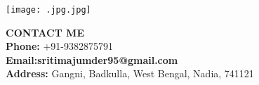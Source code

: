 \documentclass[12pt]{article}
\begin{document}
\noindent
\begin{minipage}{0.3\textwidth}
    \vspace{0.5cm}
    \texttt{[image: .jpg.jpg]}  %
    
    \vspace{0.5cm}
    \colorbox{
        \begin{minipage}{\textwidth}
            \vspace{0.3cm}
            \textbf{PROFILE} \\
            Bachelor in Computer Application student. I consider myself a responsible and orderly person.\\
            I am looking forward to my first work experience.
            \vspace{0.3cm}
        \end{minipage}
    }
    
    \vspace{0.5cm}
    {
        \begin{minipage}{\textwidth}
            \vspace{0.3cm}
            \textbf{CONTACT ME} \\
            \textbf{Phone:} +91-9382875791 \\
            \textbf{Email:sritimajumder95@gmail.com} \\
            \textbf{Address:} Gangni, Badkulla, West Bengal, Nadia, 741121 \\
            \vspace{0.3cm}
        \end{minipage}
    }
\end{minipage}
\hfill
\end{document}
